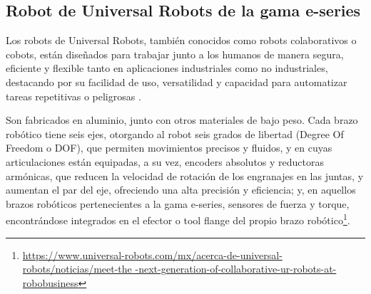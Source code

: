 \subsection{Robot de Universal Robots de la gama e-series}
\label{subsec:URe-series}

Los robots de Universal Robots, también conocidos como robots colaborativos o cobots, están diseñados para trabajar junto a los humanos de manera segura, eficiente y flexible tanto en aplicaciones industriales como no industriales, destacando por su facilidad de uso, versatilidad y capacidad para automatizar tareas repetitivas o peligrosas \cite{UR_e-series_brochure18}. 

Son fabricados en aluminio, junto con otros materiales de bajo peso. %
Cada brazo robótico tiene seis ejes, otorgando al robot seis grados de libertad (Degree Of Freedom o DOF), que permiten movimientos precisos y fluidos, y en cuyas articulaciones están equipadas, a su vez, encoders absolutos y reductoras armónicas, que reducen la velocidad de rotación de los engranajes en las juntas, y aumentan el par del eje, ofreciendo una alta precisión y eficiencia; y, en aquellos brazos robóticos pertenecientes a la gama e-series, sensores de fuerza y torque, encontrándose integrados en el efector o tool flange del propio brazo robótico\footnote{\url{https://www.universal-robots.com/mx/acerca-de-universal-robots/noticias/meet-the
-next-generation-of-collaborative-ur-robots-at-robobusiness}}.


